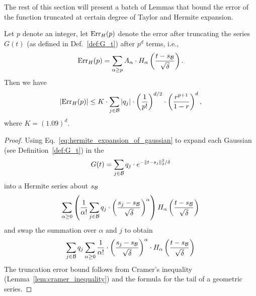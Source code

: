 The rest of this section will present a batch of Lemmas that bound the error of the function truncated at certain degree of Taylor and Hermite expansion.
\begin{lemma}\label{lem:fast_gaussian_lemma_1}
Let $p$ denote an integer, let $\mathrm{Err}_H(p)$ denote the error after truncating the series $G(t)$ (as defined in Def.~\ref{def:G_t}) after $p^d$ terms, i.e.,
\begin{align*}
\mathrm{Err}_H(p) = \sum_{\alpha \geq p} A_{\alpha} \cdot H_{\alpha} \left( \frac{t - s_{\cal B}}{ \sqrt{\delta} } \right).
\end{align*}
 Then we have
\begin{align*}
| \mathrm{Err}_H(p) | \leq K \cdot \sum_{j \in {\cal B}} |q_j| \cdot \left( \frac{1}{p !} \right)^{d/2} \cdot \left( \frac{ r^{ p + 1 } }{ 1 - r } \right)^d,
\end{align*}
where $K = (1.09)^d$.
\end{lemma}
\begin{proof}
Using Eq.~\eqref{eq:hermite_expansion_of_gaussian} to expand each Gaussian (see Definition~\ref{def:G_t}) in the 
\begin{align*}
G(t) = \sum_{j \in {\cal B}} q_j \cdot e^{ - \| t - s_j \|_2^2 / \delta }
\end{align*}
into a Hermite series about $s_{\cal B}$
\begin{align*}
\sum_{\alpha \geq 0} \left( \frac{1}{\alpha !} \sum_{j \in {\cal B}} q_j \cdot \left( \frac{ s_j - s_{\cal B} }{ \sqrt{\delta} } \right)^{\alpha} \right) H_{\alpha} \left( \frac{t - s_{\cal B}}{ \sqrt{\delta} } \right)
\end{align*}
and swap the summation over $\alpha$ and $j$ to obtain
\begin{align*}
 \sum_{j \in {\cal B}} q_j \sum_{\alpha \geq 0}  \frac{1}{\alpha !} \cdot \left( \frac{ s_j - s_{\cal B} }{ \sqrt{\delta} } \right)^{\alpha} \cdot H_{\alpha} \left( \frac{t - s_{\cal B}}{ \sqrt{\delta} } \right)
\end{align*}
The truncation error bound follows from Cramer's inequality (Lemma~\ref{lem:cramer_inequality}) and the formula for the tail of a geometric series.


\end{proof}



